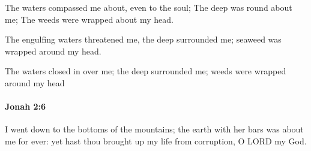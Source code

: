 			\begin{versebox}
					\item[BHS] 
					\item[LXX] 
					\item[ASV] The waters compassed me about, even to the soul; The deep was round about me; The weeds were wrapped about my head.
					\item[NIV] The engulfing waters threatened me, the deep surrounded me; seaweed was wrapped around my head.
					\item[NRSV] The waters closed in over me; the deep surrounded me; weeds were wrapped around my head
			\end{versebox}

		\paragraph{Jonah 2:6} %
			\label{JONAH-2-6}

			I went down to the bottoms of the mountains; the earth with her bars was about me for ever: yet hast thou brought up my life from corruption, O LORD my God.

